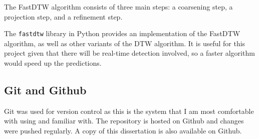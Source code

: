 \documentclass[final,rdr32.tex]{subfiles}
\begin{document}
The FastDTW algorithm consists of three main steps: a coarsening step, a projection step, and a refinement step.

The \verb|fastdtw| library in Python provides an implementation of the FastDTW algorithm, as well as other variants of the DTW algorithm. It is useful for this project given that there will be real-time detection involved, so a faster algorithm would speed up the predictions.

\subsection{Git and Github}

Git was used for version control as this is the system that I am most comfortable with using and familiar with. The repository is hosted on Github and changes were pushed regularly. A copy of this dissertation is also available on Github.
\end{document}
